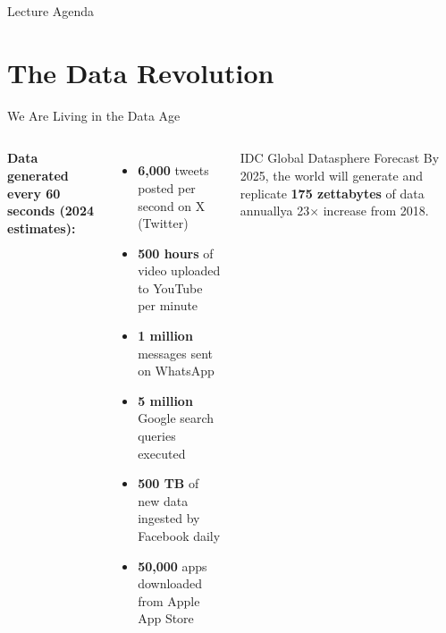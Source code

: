 \documentclass[aspectratio=169,10pt]{beamer}
\begin{document}
\begin{frame}{Lecture Agenda}
  \tableofcontents
\end{frame}

\section{The Data Revolution}

\begin{frame}{We Are Living in the Data Age}
  \begin{columns}[T]
      \textbf{Data generated every 60 seconds (2024 estimates):}
      \vspace{4pt}
      \begin{itemize}
        \item \textbf{6{,}000} tweets posted per second on X (Twitter)
        \item \textbf{500 hours} of video uploaded to YouTube per minute
        \item \textbf{1 million} messages sent on WhatsApp
        \item \textbf{5 million} Google search queries executed
        \item \textbf{500 TB} of new data ingested by Facebook daily
        \item \textbf{50{,}000} apps downloaded from Apple App Store
      \end{itemize}
      \vspace{6pt}
      \begin{alertblock}{IDC Global Datasphere Forecast}
        By 2025, the world will generate and replicate \textbf{175 zettabytes} of data annually\textemdash a 23$\times$ increase from 2018.
      \end{alertblock}


\end{columns}
\end{frame}
\end{document}
